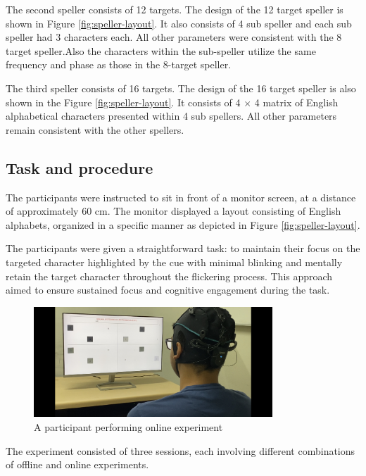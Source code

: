 The second speller consists of 12 targets. The design of the 12 target speller is shown in Figure \ref{fig:speller-layout}. It also consists of 4 sub speller and each sub speller had 3 characters each. All other parameters were consistent with the 8 target speller.Also the characters within the sub-speller utilize the same frequency and phase as those in the 8-target speller.

The third speller consists of 16 targets. The design of the 16 target speller is also shown in the Figure \ref{fig:speller-layout}. It consists of 4 $\times$ 4 matrix of English alphabetical characters presented within 4 sub spellers. All other parameters remain consistent with the other spellers.



\subsection{Task and procedure}
The participants were instructed to sit in front of a monitor screen, at a distance of approximately 60 cm. The monitor displayed a layout consisting of English alphabets, organized in a specific manner as depicted in Figure \ref{fig:speller-layout}. 

The participants were given a straightforward task: to maintain their focus on the targeted character highlighted by the cue with minimal blinking and mentally retain the target character throughout the flickering process. This approach aimed to ensure sustained focus and cognitive engagement during the task.


\begin{figure}
  \centering
  \caption{A participant performing online experiment}
  \label{fig:online-participant}
  \includegraphics[width=0.8\textwidth]{figures/experimental-setup.PNG}
\end{figure}

The experiment consisted of three sessions, each involving different combinations of offline and online experiments.

